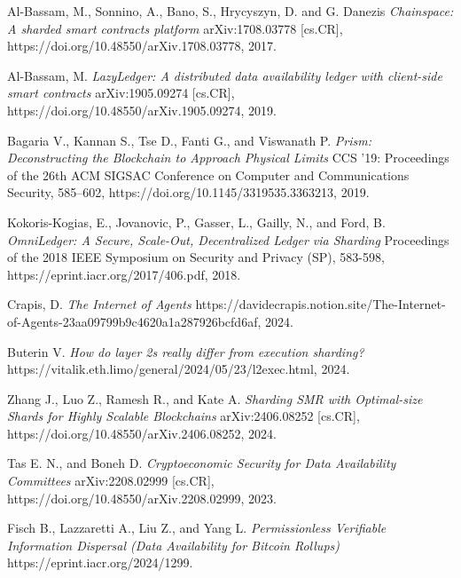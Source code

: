 \documentclass[conference]{IEEEtran}
\begin{document}
\begin{thebibliography}{}
Al-Bassam, M., Sonnino, A., Bano, S., Hrycyszyn, D. and G. Danezis \emph{Chainspace: A sharded smart contracts platform} arXiv:1708.03778 [cs.CR], https://doi.org/10.48550/arXiv.1708.03778, 2017.
 
Al-Bassam, M. \emph{LazyLedger: A distributed data availability ledger with client-side smart contracts} arXiv:1905.09274 [cs.CR], https://doi.org/10.48550/arXiv.1905.09274, 2019.

Bagaria V., Kannan S., Tse D., Fanti G., and Viswanath P. \emph{Prism: Deconstructing the Blockchain to Approach Physical Limits} CCS '19: Proceedings of the 26th ACM SIGSAC Conference on Computer and Communications Security, 585–602, https://doi.org/10.1145/3319535.3363213, 2019.

Kokoris-Kogias, E., Jovanovic, P., Gasser, L., Gailly, N., and Ford, B. \emph{OmniLedger: A Secure, Scale-Out, Decentralized Ledger via Sharding} Proceedings of the 2018 IEEE Symposium on Security and Privacy (SP), 583-598, https://eprint.iacr.org/2017/406.pdf, 2018.

Crapis, D. \emph{The Internet of Agents} https://davidecrapis.notion.site/The-Internet-of-Agents-23aa09799b9c4620a1a287926bcfd6af, 2024.

Buterin V. \emph{How do layer 2s really differ from execution sharding?}
https://vitalik.eth.limo/general/2024/05/23/l2exec.html, 2024.

Zhang J., Luo Z., Ramesh R., and Kate A. \emph{Sharding SMR with Optimal-size Shards for Highly Scalable Blockchains} arXiv:2406.08252 [cs.CR], https://doi.org/10.48550/arXiv.2406.08252, 2024.

Tas E. N., and Boneh D. \emph{Cryptoeconomic Security for Data Availability Committees} arXiv:2208.02999 [cs.CR], https://doi.org/10.48550/arXiv.2208.02999, 2023.

Fisch B., Lazzaretti A., Liu Z., and Yang L. \emph{Permissionless Verifiable Information Dispersal (Data Availability for Bitcoin Rollups)} https://eprint.iacr.org/2024/1299.

\end{thebibliography}
\end{document}
